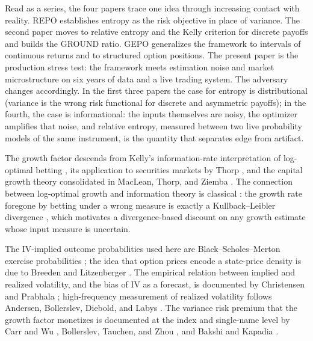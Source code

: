 \documentclass[11pt]{article}
\begin{document}
Read as a series, the four papers trace one idea through increasing contact
with reality. REPO \cite{mercurio2020repo} establishes entropy as the risk
objective in place of variance. The second paper \cite{mercurio2020binary}
moves to relative entropy and the Kelly criterion for discrete payoffs and
builds the GROUND ratio. GEPO \cite{mercurio2020gepo} generalizes the
framework to intervals of continuous returns and to structured option
positions. The present paper is the production stress test: the framework
meets estimation noise and market microstructure on six years of data and a
live trading system. The adversary changes accordingly. In the first three
papers the case for entropy is distributional (variance is the wrong risk
functional for discrete and asymmetric payoffs); in the fourth, the case is
informational: the inputs themselves are noisy, the optimizer amplifies that
noise, and relative entropy, measured between two live probability models of
the same instrument, is the quantity that separates edge from artifact.

The growth factor descends from Kelly's information-rate interpretation of
log-optimal betting \cite{kelly1956}, its application to securities markets by
Thorp \cite{thorp1971}, and the capital growth theory consolidated in MacLean,
Thorp, and Ziemba \cite{maclean2011}. The connection between log-optimal
growth and information theory is classical \cite{coverthomas2006}: the growth
rate foregone by betting under a wrong measure is exactly a Kullback--Leibler
divergence \cite{kullback1951}, which motivates a divergence-based discount on
any growth estimate whose input measure is uncertain.

The IV-implied outcome probabilities used here are Black--Scholes--Merton
exercise probabilities \cite{blackscholes1973, merton1973}; the idea that
option prices encode a state-price density is due to Breeden and Litzenberger
\cite{breeden1978}. The empirical relation between implied and realized
volatility, and the bias of IV as a forecast, is documented by Christensen and
Prabhala \cite{christensen1998}; high-frequency measurement of realized
volatility follows Andersen, Bollerslev, Diebold, and Labys
\cite{andersen2003}. The variance risk premium that the growth factor
monetizes is documented at the index and single-name level by Carr and Wu
\cite{carrwu2009}, Bollerslev, Tauchen, and Zhou \cite{bollerslev2009}, and
Bakshi and Kapadia \cite{bakshikapadia2003}.
\end{document}
